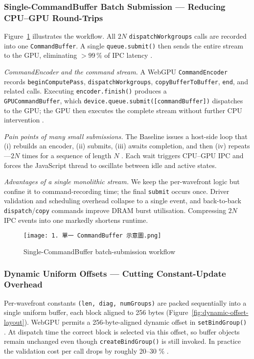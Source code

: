 \documentclass[PhD]{PHlab-thesis}
\begin{document}
\subsubsection{Single-CommandBuffer Batch Submission — Reducing CPU–GPU Round-Trips}
Figure~\ref{fig:scb-batch-workflow} illustrates the workflow. All $2N$ \texttt{dispatchWorkgroups} calls are recorded into one \texttt{CommandBuffer}. A single \texttt{queue.submit()} then sends the entire stream to the GPU, eliminating \(>\!99\,\%\) of IPC latency \cite{Chrome2024-blog}.

\textit{CommandEncoder and the command stream.}  
A WebGPU \texttt{CommandEncoder} records \texttt{beginComputePass}, \texttt{dispatchWorkgroups}, \texttt{copyBufferToBuffer}, \texttt{end}, and related calls. Executing \texttt{encoder.finish()} produces a \\ \texttt{GPUCommandBuffer}, which \texttt{device.queue.submit([commandBuffer])} dispatches to the GPU; the GPU then executes the complete stream without further CPU intervention \cite{W3C2024-webgpu}.

\textit{Pain points of many small submissions.}  
The Baseline issues a host-side loop that (i) rebuilds an encoder, (ii) submits, (iii) awaits completion, and then (iv) repeats—\(2N\) times for a sequence of length \(N\) \cite{Chrome2024-blog}. Each wait triggers CPU–GPU IPC and forces the JavaScript thread to oscillate between idle and active states.

\textit{Advantages of a single monolithic stream.}  
We keep the per-wavefront logic but confine it to command-recording time; the final \texttt{submit} occurs once. Driver validation and scheduling overhead collapse to a single event, and back-to-back \texttt{dispatch}/\texttt{copy} commands improve DRAM burst utilisation. Compressing \(2N\) IPC events into one markedly shortens runtime.

\begin{figure}[htbp]
  \centering
  \texttt{[image: 1. 單一 CommandBuffer 示意圖.png]}
  \caption{Single-CommandBuffer batch-submission workflow}
  \label{fig:scb-batch-workflow}
\end{figure}

\subsubsection{Dynamic Uniform Offsets — Cutting Constant-Update Overhead}
Per-wavefront constants \texttt{(len, diag, numGroups)} are packed sequentially into a single uniform buffer, each block aligned to 256 bytes (Figure~\ref{fig:dynamic-offset-layout}). WebGPU permits a 256-byte-aligned dynamic offset in \texttt{setBindGroup()} \cite{W3C2024-webgpu}. At dispatch time the correct block is selected via this offset, so buffer objects remain unchanged even though \texttt{createBindGroup()} is still invoked. In practice the validation cost per call drops by roughly 20–30 \% \cite{Chrome2024-blog}.
\end{document}
